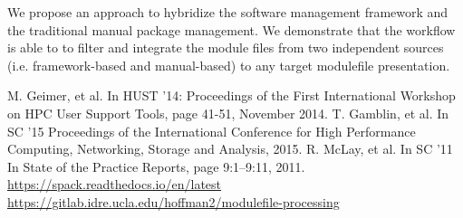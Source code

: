 \documentclass[conference]{IEEEtran}
\begin{document}
We propose an approach to hybridize the software management framework and the traditional manual package management.
We demonstrate that the workflow is able to to filter and integrate the module files from two independent sources (i.e. framework-based and manual-based) to any target modulefile presentation. 

\begin{thebibliography}{00}
 M. Geimer, et al. In HUST '14: Proceedings of the First International Workshop on HPC User Support Tools, page 41-51, November 2014.
 T. Gamblin, et al. In SC ’15 Proceedings of the International Conference for High Performance Computing, Networking, Storage and Analysis, 2015.
 R. McLay, et al. In SC ’11 In State of the Practice Reports, page 9:1–9:11, 2011.
 \href{https://spack.readthedocs.io/en/latest}{https://spack.readthedocs.io/en/latest}
 \href{https://gitlab.idre.ucla.edu/hoffman2/modulefile-processing}{https://gitlab.idre.ucla.edu/hoffman2/modulefile-processing}
\end{thebibliography}
\end{document}
